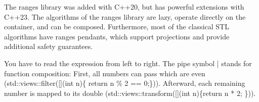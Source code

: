 
The ranges library was added with C++20, but has powerful extensions with C++23. The algorithms of the ranges library are lazy, operate directly on the container, and can be composed. Furthermore, most of the classical STL algorithms have ranges pendants, which support projections and provide additional safety guarantees.



You have to read the expression from left to right. The pipe symbol | stands for function composition: First, all numbers can pass which are even (std::views::filter([](int n)\{ return n \% 2 == 0;\})). Afterward, each remaining number is mapped to its double (std::views::transform([](int n)\{return n * 2; \})).





















